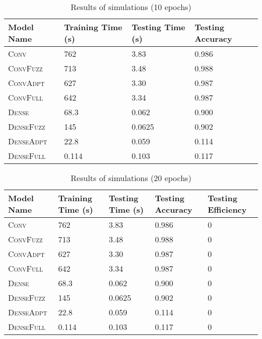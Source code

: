 \documentclass{article}
\begin{document}
\begin{table}[h]
  \caption{Results of simulations (10 epochs)}
  \label{tbl:results2}
  \centering
  \begin{tabular}{llll}
    \toprule
    Model Name & Training Time (s) & Testing Time (s) & Testing Accuracy \\
    \midrule
    \textsc{Conv}         & 762 & 3.83 & 0.986 \\
    \textsc{ConvFuzz}     & 713 & 3.48 & 0.988 \\
    \textsc{ConvAdpt}     & 627 & 3.30 & 0.987 \\
    \textsc{ConvFull}     & 642 & 3.34 & 0.987 \\
    \textsc{Dense}        & 68.3 & 0.062 & 0.900 \\
    \textsc{DenseFuzz}    & 145 & 0.0625 & 0.902 \\
    \textsc{DenseAdpt}    & 22.8 & 0.059 & 0.114 \\
    \textsc{DenseFull}    & 0.114 & 0.103 & 0.117 \\
    \bottomrule
  \end{tabular}
\end{table}

\begin{table}[h]
  \caption{Results of simulations (20 epochs)}
  \label{tbl:results3}
  \centering
  \begin{tabular}{lllll}
    \toprule
    Model Name & Training Time (s) & Testing Time (s) & Testing Accuracy & Testing Efficiency \\
    \midrule
    \textsc{Conv}         & 762 & 3.83 & 0.986 & 0 \\
    \textsc{ConvFuzz}     & 713 & 3.48 & 0.988 & 0 \\
    \textsc{ConvAdpt}     & 627 & 3.30 & 0.987 & 0 \\
    \textsc{ConvFull}     & 642 & 3.34 & 0.987 & 0 \\
    \textsc{Dense}        & 68.3 & 0.062 & 0.900 & 0 \\
    \textsc{DenseFuzz}    & 145 & 0.0625 & 0.902 & 0 \\
    \textsc{DenseAdpt}    & 22.8 & 0.059 & 0.114 & 0 \\
    \textsc{DenseFull}    & 0.114 & 0.103 & 0.117 & 0 \\
    \bottomrule
  \end{tabular}
\end{table}
\end{document}
